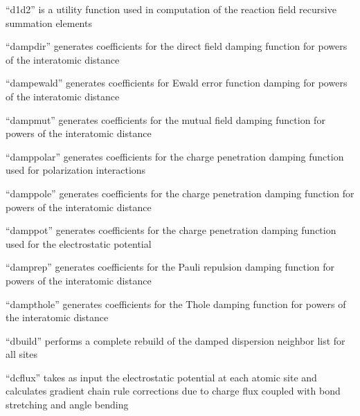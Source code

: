 \documentclass[letterpaper,11pt,english]{sphinxmanual}
\begin{document}
“d1d2” is a utility function used in computation of the
reaction field recursive summation elements


“dampdir” generates coefficients for the direct field damping
function for powers of the interatomic distance


“dampewald” generates coefficients for Ewald error function
damping for powers of the interatomic distance


“dampmut” generates coefficients for the mutual field damping
function for powers of the interatomic distance


“damppolar” generates coefficients for the charge penetration
damping function used for polarization interactions


“damppole” generates coefficients for the charge penetration
damping function for powers of the interatomic distance


“damppot” generates coefficients for the charge penetration
damping function used for the electrostatic potential


“damprep” generates coefficients for the Pauli repulsion
damping function for powers of the interatomic distance


“dampthole” generates coefficients for the Thole damping
function for powers of the interatomic distance


“dbuild” performs a complete rebuild of the damped dispersion
neighbor list for all sites


“dcflux” takes as input the electrostatic potential at each
atomic site and calculates gradient chain rule corrections due
to charge flux coupled with bond stretching and angle bending

\end{document}
